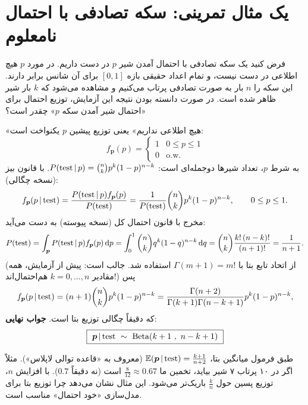 \section{یک مثال تمرینی: سکه تصادفی با احتمال نامعلوم}

\begin{example}
فرض کنید یک سکه تصادفی با احتمال آمدن شیر $p$ در دست داریم. در مورد $p$ هیچ اطلاعی در دست نیست، و تمام اعداد حقیقی بازه $[0,1]$ برای آن شانس برابر دارند. این سکه را $n$ بار به صورت تصادفی پرتاب می‌کنیم و مشاهده می‌شود که $k$ بار شیر ظاهر شده است. در صورت دانسته بودن نتیجه این آزمایش، توزیع احتمال برای «احتمال شیر آمدن سکه $p$» چقدر است؟
\begin{solution}
«هیچ اطلاعی نداریم» یعنی توزیع پیشین $p$ یکنواخت است:
\[
f_{\bm p}(p)=\begin{cases}1 & 0\le p\le1\\ 0 & \text{o.w.}\end{cases}
\]
به شرط $p$، تعداد شیرها دوجمله‌ای است: $P(\text{test}\,|\, p)=\binom nkp^k(1-p)^{n-k}$. با قانون بیز (نسخه چگالی):
\[
f_{\bm p}(p\,|\,\text{test})=\frac{P(\text{test}\,|\, p)f_{\bm p}(p)}{P(\text{test})}=\frac{1}{P(\text{test})}\binom nkp^k(1-p)^{n-k},\qquad0\le p\le1 .
\]
مخرج با قانون احتمال کل (نسخه پیوسته) به دست می‌آید:
\[
P(\text{test})=\int_{\bm p}P(\text{test}\,|\, p)f_{\bm p}(p)\,\mathrm{d} p=\int_0^1\binom nkq^k(1-q)^{n-k}\,\mathrm{d} q=\binom nk\frac{k!\,(n-k)!}{(n+1)!}=\frac{1}{n+1}.
\]
(از اتحاد تابع بتا با $\Gamma(m+1)=m!$ استفاده شد. جالب است: پیش از آزمایش، همه مقادیر $k=0,\ldots,n$ هم‌احتمال‌اند!) پس
\[
f_{\bm p}(p\,|\,\text{test})=(n+1)\binom nkp^k(1-p)^{n-k}=\frac{\Gamma(n+2)}{\Gamma(k+1)\Gamma(n-k+1)}p^{k}(1-p)^{n-k},
\]
که دقیقاً چگالی توزیع بتا است. \textbf{جواب نهایی}:
\[
\boxed{\ \bm p\given\text{test}\ \sim\ \mathrm{Beta}(k+1\ ,\ n-k+1)\ }
\]
\end{solution}
\end{example}

\begin{note}
\notetitle طبق فرمول میانگین بتا، $\mathbb{E}(\bm p\,|\,\text{test})=\frac{k+1}{n+2}$ (معروف به «قاعده توالی لاپلاس»). مثلاً اگر در ۱۰ پرتاب ۷ شیر بیاید، تخمین ما $\frac{8}{12}\approx0.67$ است (نه دقیقاً $0.7$). با افزایش $n$، توزیع پسین حول $\frac kn$ باریک‌تر می‌شود. این مثال نشان می‌دهد چرا توزیع بتا برای مدل‌سازی «خود احتمال» مناسب است.
\end{note}

\begin{center}
\end{center}

